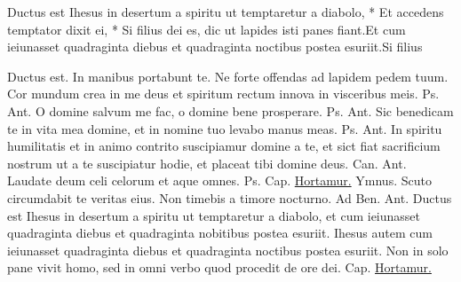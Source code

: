 \begin{multicols*}{2}
\begin{responsory-final}
{Ductus est Ihesus in desertum a spiritu ut temptaretur a diabolo, * Et accedens temptator dixit ei, * Si filius dei es, dic ut lapides isti panes fiant.}{Et cum ieiunasset quadraginta diebus et quadraginta noctibus postea esuriit.}{Si filius}
\end{responsory-final}
{Ductus est.} \V In manibus portabunt te. \R Ne forte offendas ad lapidem pedem tuum.
 Cor mundum crea in me deus et spiritum rectum innova in visceribus meis. {\color{Red} Ps.}  {\color{Red} Ant.} O domine salvum me fac, o domine bene prosperare. {\color{Red} Ps.}  {\color{Red} Ant.} Sic benedicam te in vita mea domine, et in nomine tuo levabo manus meas. {\color{Red} Ps.}  {\color{Red} Ant.} In spiritu humilitatis et in animo contrito suscipiamur domine a te, et sict fiat sacrificium nostrum ut a te suscipiatur hodie, et placeat tibi domine deus. {\color{Red} Can.}  {\color{Red} Ant.} Laudate deum celi celorum et aque omnes. {\color{Red} Ps.}  {\color{Red} Cap.} \hyperlink{hortamur-vos}{Hortamur.} {\color{Red} Ymnus.}
\newline \V Scuto circumdabit te veritas eius. \R Non timebis a timore nocturno. {\color{Red} Ad Ben. Ant.} Ductus est Ihesus in desertum a spiritu ut temptaretur a diabolo, et cum ieiunasset quadraginta diebus et quadraginta nobitibus postea esuriit.
 Ihesus autem cum ieiunasset quadraginta diebus et quadraginta noctibus postea esuriit.
 Non in solo pane vivit homo, sed in omni verbo quod procedit de ore dei. {\color{Red} Cap.} \hyperlink{hortamur-vos}{Hortamur.}

\end{multicols*}
